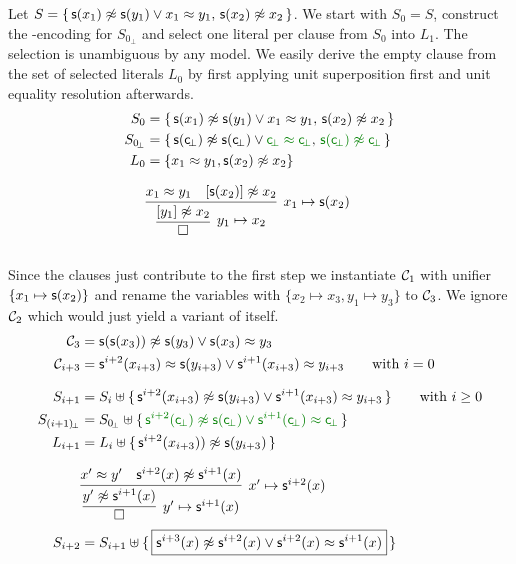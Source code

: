 \begin{example}\label{ex:nat:instgeneq}
	Let $S = \{\, {\mathsf s}(x_1) \not\approx {\mathsf s} (y_1) \lor x_1 \approx y_1, \, {\mathsf s}(x_2)\not\approx x_2 \, \}$. 
	We start with $S_0 = S$, construct the \SMT-encoding for $S_{0\!_\bot}$
	and select one literal per clause from $S_0$ into $L_1$. 
	The selection is unambiguous by any model.
	We easily derive the empty clause from the set of selected literals $L_0$ 
	by first applying unit superposition first and unit equality resolution afterwards.
\begin{align*}
	S_0 &= \{\, {\msucc(x_1) \mNE \msucc (y_1) \lor x_1 \mEQ y_1}, \, \msucc(x_2)\mNE x_2 \, \} 
	\\
	S_{0\!_\bot} &= \{\, \msucc(\consbot) \mNE \msucc (\consbot) \lor{\colHi\consbot \mEQ \consbot}, \, 
	{\colHi \msucc(\consbot)\mNE \consbot} \, \}
	\\
	L_0 &= \{ x_1\mEQ y_1, \msucc(x_2)\mNE x_2  \}
	\\[0.7em]
	&\infer[x_1\mapsto \msucc(x_2)
	]{ 
		\infer[y_1\mapsto x_2]{\emptyclause}{ [{y_1}]\mNE x_2 }
	}
	{x_1 \mEQ y_1 & [{\msucc(x_2)}]\mNE x_2}
	\\[0.7em]
\end{align*}

Since the clauses just contribute to the first step we instantiate ${\mathcal C}_1$ with unifier $\{ x_1\mapsto{\mathsf s}(x_2)\}$ 
and rename the variables with $\{ x_2\mapsto x_3, y_1\mapsto y_3 \}$ to ${\mathcal C}_3$. 
We ignore ${\mathcal C}_2$ which would just yield a variant of itself.
\begin{align*}
	\mcC_3 &= \msucc(\msucc(x_3)) \mNE \msucc(y_3) \lor \msucc(x_3) \mEQ y_3
	\\
	\mcC_{i+3} &= \msucc^{i+2}(x_{i+3})\mEQ \msucc(y_{i+3}) \lor \msucc^{i+1}(x_{i+3})\mEQ y_{i+3}
	\tag*{with $i=0$}
	\\[0.7em]
	S_{i+1} &= S_i\disjointunion \{\,
	\msucc^{i+2}(x_{i+3}) \mNE \msucc(y_{i+3}) \lor \msucc^{i+1}(x_{i+3}) \mEQ y_{i+3} \,
	\}
	\tag*{with $i\geq 0$}
	\\
	S_{(i+1)\!_\bot} &= S_{0\!_\bot}\disjointunion \{\,
	{\colHi\msucc^{i+2}(\consbot) \mNE \msucc(\consbot) \lor {\msucc^{i+1}(\consbot) \mEQ \consbot}} \,
	\}
	\\
	L_{i+1} &= L_i \disjointunion \{\, 
		\msucc^{i+2}(x_{i+3})) \mNE \msucc(y_{i+3})
	\,\}
	\\[0.7em]
	&\infer[x'\mapsto \msucc^{i+2}(x)
	]{ 
		\infer[y'\mapsto \msucc^{i+1}(x)]{\emptyclause}{ y'\mNE \msucc^{i+1}(x) }
	}
	{x' \mEQ y' & \msucc^{i+2}(x)\mNE \msucc^{i+1}(x)}
	\\
	S_{i+2} &= S_{i+1}\disjointunion \{\,
	\boxed{\msucc^{i+3}(x) \mNE \msucc^{i+2}(x) \lor \msucc^{i+2}(x) \mEQ \msucc^{i+1}(x)} \,
	\} 
\end{align*}


\end{example}
